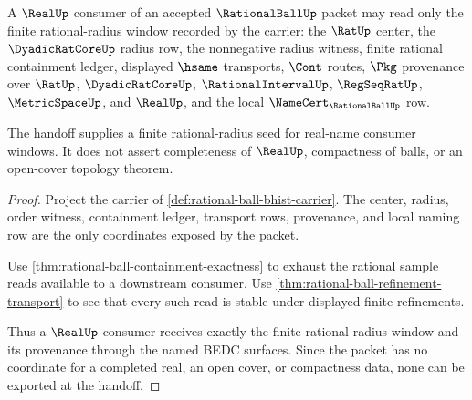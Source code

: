 \begin{theorem}
\label{thm:rational-ball-real-window-handoff}
A $\RealUp$ consumer of an accepted $\RationalBallUp$ packet may read only the
finite rational-radius window recorded by the carrier: the $\RatUp$ center,
the $\DyadicRatCoreUp$ radius row, the nonnegative radius witness, finite
rational containment ledger, displayed $\hsame$ transports, $\Cont$ routes,
$\Pkg$ provenance over $\RatUp$, $\DyadicRatCoreUp$, $\RationalIntervalUp$,
$\RegSeqRatUp$, $\MetricSpaceUp$, and $\RealUp$, and the local
$\NameCert_{\RationalBallUp}$ row.

The handoff supplies a finite rational-radius seed for real-name consumer
windows. It does not assert completeness of $\RealUp$, compactness of balls,
or an open-cover topology theorem.
\end{theorem}
\begin{proof}
Project the carrier of \autoref{def:rational-ball-bhist-carrier}. The center,
radius, order witness, containment ledger, transport rows, provenance, and
local naming row are the only coordinates exposed by the packet.

Use \autoref{thm:rational-ball-containment-exactness} to exhaust the rational
sample reads available to a downstream consumer. Use
\autoref{thm:rational-ball-refinement-transport} to see that every such read
is stable under displayed finite refinements.

Thus a $\RealUp$ consumer receives exactly the finite rational-radius window
and its provenance through the named BEDC surfaces. Since the packet has no
coordinate for a completed real, an open cover, or compactness data, none can
be exported at the handoff.
\end{proof}

